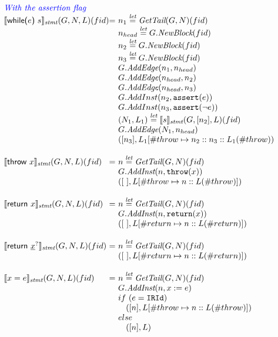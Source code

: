 \[\begin{array}{l@{}l@{~}l}
{\inblue \textit{With the assertion flag}} \\
\transfun{\ircfgwhile{e}{s}}_{\emph{stmt}}(G,N,L)(fid) & = &
	n_1 \letval \GetTail(G,N)(fid)\\
	& & n_{head} \letval G.\emph{NewBlock}(fid)\\
	& & n_2 \letval G.\emph{NewBlock}(fid)\\
	& & n_3 \letval G.\emph{NewBlock}(fid)\\
	& & G.\emph{AddEdge}(n_1,n_{head})\\
	& & G.\emph{AddEdge}(n_{head},n_2)\\
	& & G.\emph{AddEdge}(n_{head},n_3)\\
	& & G.AddInst(n_2, \TT{assert}(e))\\
	& & G.AddInst(n_3, \TT{assert}(\neg e))\\
	& & (N_1,L_1) \letval \transfun{s}_{\emph{stmt}}(G,[n_2],L)(fid)\\
	& & G.\emph{AddEdge}(N_1,n_{head})\\
	& & ([n_3],L_1[\#throw \mapsto n_2::n_3::L_1(\#throw)) \\
	& & \\
	
\transfun{\irthrow{x}}_{\emph{stmt}}(G,N,L)(fid) & = &
	n \letval \GetTail(G,N)(fid)\\
	& & G.\emph{AddInst}(n,\TT{throw}(x))\\
	& & ([\ ],L[\#throw \mapsto n::L(\#throw)])\\
	& & \\

\transfun{\ircfgreturn{x}}_{\emph{stmt}}(G,N,L)(fid) & = &
	n \letval \GetTail(G,N)(fid)\\
	& & G.\emph{AddInst}(n,\TT{return}(x))\\
	& & ([\ ],L[\#return \mapsto n::L(\#return)])\\
	& & \\
	
\transfun{\irreturn{}}_{\emph{stmt}}(G,N,L)(fid) & = &
	n \letval \GetTail(G,N)(fid)\\
	& & ([\ ],L[\#return \mapsto n::L(\#return)])\\
	& & \\
	
\transfun{\ircfgexpr{x}{e}}_{\emph{stmt}}(G,N,L)(fid) & = &
	n \letval \GetTail(G,N)(fid)\\
	& & G.\emph{AddInst}(n,x := e)\\
	& & if\ (e = \TT{IRId}) \\
	& & \phantom{if} ([n],L[\#throw \mapsto n::L(\#throw)])\\
	& & else \\
	& & \phantom{if} ([n],L)\\
	& & \\
	
\end{array}
\]


